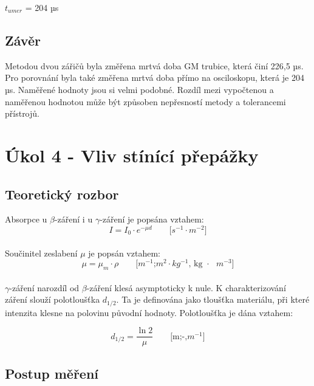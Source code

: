 \documentclass{protokol}
\begin{document}

    $t_{umer}$ = 204 µs
    


    \subsection{Závěr}

    Metodou dvou zářičů byla změřena mrtvá doba GM trubice, která činí 226,5 µs. Pro porovnání byla také změřena mrtvá doba přímo na osciloskopu, která je 204 µs. Naměřené hodnoty jsou si velmi podobné. Rozdíl mezi vypočtenou a naměřenou hodnotou může být způsoben nepřesností metody a tolerancemi přístrojů.

\pagebreak

\section{Úkol 4 - Vliv stínící přepážky}
    \subsection{Teoretický rozbor}

    Absorpce u $\beta$-záření i u $\gamma$-záření je popsána vztahem:
    \begin{equation}   
        I = I_0 \cdot e^{-\mu d}      \quad \quad    \text{[$s^{-1}$$\cdot$$m^{-2}$]}
    \end{equation}
    \\
    Součinitel zeslabení $\mu$ je popsán vztahem:
    \begin{equation}   
        \mu =  \mu_m \cdot \rho      \quad \quad    \text{[$m^{-1}$;$m^2$$\cdot$$kg^{-1}$, kg $\cdot$ $m^{-3}$]}
    \end{equation}
    \\
    $\gamma$-záření narozdíl od $\beta$-záření klesá asymptoticky k nule. K charakterizování záření slouží polotloušťka $d_{1/2}$. Ta je definována jako tloušťka materiálu, při které intenzita klesne na polovinu původní hodnoty. Polotloušťka je dána vztahem:

    \begin{equation}   
        d_{1/2} =  \dfrac{\ln{2}}{\mu}      \quad \quad    \text{[m;-,$m^{-1}$]}
    \end{equation}

    \subsection{Postup měření}
\end{document}
